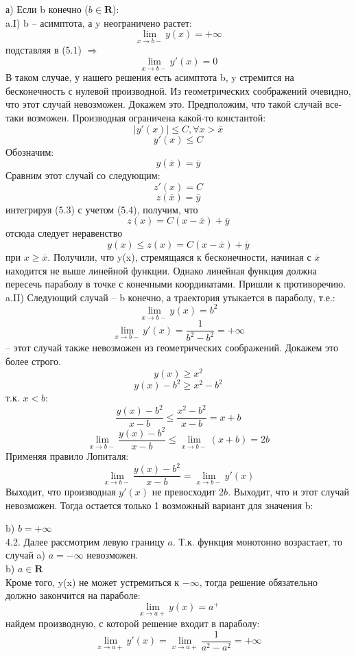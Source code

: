 \documentclass[10pt]{report}
\begin{document}
а) Если b конечно ($ b \in \textbf{R}$):\\
a.I) b -- асимптота, а y неограничено растет: \[ \lim\limits_{x\to b-} y(x) = + \infty \]
подставляя в (5.1) $\Rightarrow$ 
\[ \lim\limits_{x\to b-} y'(x) = 0\]
В таком случае, у нашего решения есть асимптота b, y стремится на бесконечность с нулевой производной. Из геометрических соображений очевидно, что этот случай невозможен. Докажем это. Предположим, что такой случай все-таки возможен. Производная ограничена какой-то константой: 
\[|y'(x)| \leq C, \forall x >  \overline {x}\]
\[y' (x) \leq C\]
Обозначим:
\[y(\overline{x}) = \overline{y}\]
Сравним этот случай со следующим:
\begin{equation}
z' (x) = C
\end{equation}
\begin{equation}
z(\overline{x}) = \overline{y}
\end{equation}
 интегрируя (5.3) с учетом (5.4), получим, что 
\[ z(x) = C(x-\overline{x})+\overline{y}\]
отсюда следует неравенство
\[ y(x) \leq z(x) = C(x-\overline{x})+\overline{y}\] при $ x \geq \overline{x}$.
Получили, что y(x), стремящаяся к бесконечности, начиная с  $\overline{x}$ находится не выше линейной функции. Однако линейная функция должна пересечь параболу в точке с конечными координатами. Пришли к противоречию.\\ 
a.II) Следующий случай -- b конечно, а траектория утыкается в параболу, т.е.:
\[ \lim\limits_{x\to b-} y(x) = b^2\]
\[\lim\limits_{x\to b-} y'(x) = \frac {1} {b^2-b^2} = +\infty\]
-- этот случай также невозможен из геометрических соображений. Докажем это более строго.
\[y(x) \geq x^2\]
\[y(x)-b^2 \geq x^2-b^2\]
т.к. $x<b$:
\[ \frac {y(x)-b^2} { x-b} \leq  \frac {x^2-b^2} { x-b} = x+b\]
\[ \lim\limits_{x\to b-} \frac {y(x)-b^2} { x-b} \leq \lim\limits_{x\to b-} (x+b) = 2b\]
Применяя правило Лопиталя:
\[ \lim\limits_{x\to b-} \frac {y(x)-b^2} { x-b}  =\lim\limits_{x\to b-} y'(x)\]
Выходит, что производная $y'(x)$ не превосходит $2b$. Выходит, что и этот случай невозможен. Тогда остается только 1 возможный вариант для значения b:

b) $ b = +\infty$\\

4.2. Далее рассмотрим левую границу $a$.  Т.к. функция монотонно возрастает, то случай a) $ a = -\infty$ невозможен.\\
b) $a \in \textbf {R}$\\
Кроме того, y(x) не может устремиться к $-\infty$, тогда решение обязательно должно закончится на параболе:
\[\lim\limits_{x\to a+} y(x) =a^{+}\]
найдем производную, с которой решение входит в параболу:
\[\lim\limits_{x\to a+} y'(x) =\lim\limits_{x\to a+} \frac 1 {a^2-a^2} =+\infty\]
\end{document}
